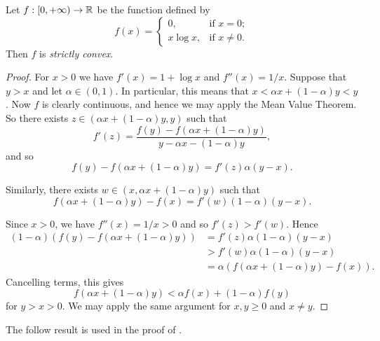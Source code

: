 \begin{theorem} \label{thm:walters-4-2-xlogx-convex}
	Let $f : [0, +\infty) \to \mathbb{R}$ be the function defined by
	\[
		f(x) =
		\begin{cases}
			0, & \text{if } x = 0; \\
			x\log{x}, & \text{if } x \neq 0.
		\end{cases}
	\]
	Then $f$ is \emph{strictly convex}.
	\begin{proof}
		For $x > 0$ we have $f'(x) = 1 + \log{x}$ and $f''(x) = 1 / x$. Suppose that $y > x$ and let $\alpha \in (0, 1)$. In particular, this means that $x < \alpha x + (1 - \alpha)y < y$. Now $f$ is clearly continuous, and hence we may apply the Mean Value Theorem. So there exists $z \in (\alpha x + (1 - \alpha)y, y)$ such that
		\[
			f'(z) = \frac{f(y) - f(\alpha x + (1 - \alpha)y)}{y - \alpha x - (1 - \alpha)y},
		\]
		and so
		\[
			f(y) - f(\alpha x + (1 - \alpha)y) = f'(z)\alpha(y - x).
		\]
		
		Similarly, there exists $w \in (x, \alpha x + (1 - \alpha)y)$ such that
		\[
			f(\alpha x + (1 - \alpha)y) - f(x) = f'(w)(1 - \alpha)(y - x).
		\]
		
		Since $x > 0$, we have $f''(x) = 1 / x > 0$ and so $f'(z) > f'(w)$. Hence
		\begin{align*}
			(1 - \alpha)(f(y) - f(\alpha x + (1 - \alpha)y)) &= f'(z)\alpha(1 - \alpha)(y - x) \\
				&> f'(w)\alpha(1 - \alpha)(y - x) \\
				&= \alpha(f(\alpha x + (1 - \alpha)y) - f(x)).
		\end{align*}
		Cancelling terms, this gives
		\[
			f(\alpha x + (1 - \alpha)y) < \alpha f(x) + (1 - \alpha)f(y)
		\]
		for $y > x > 0$. We may apply the same argument for $x, y \geq 0$ and $x \neq y$.
	\end{proof}
\end{theorem}

The follow result is used in the proof of . %


